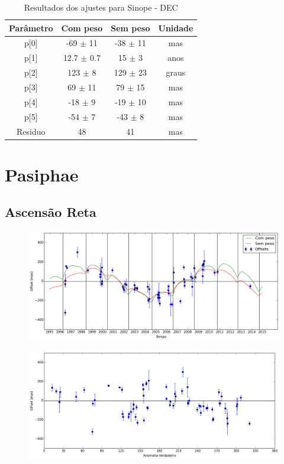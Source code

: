 \documentclass[11pt,a4paper]{report}
\begin{document}
\begin{table}[h!]
\caption{\label{Tab: Sinope-DEC} Resultados dos ajustes para Sinope - DEC}
\begin{centering}
\begin{tabular}{cccc}
\hline
\hline
Parâmetro & Com peso & Sem peso & Unidade\tabularnewline
\hline
p[0] & -69 $\pm$ 11 & -38 $\pm$ 11 & mas\\
p[1] & 12.7 $\pm$ 0.7 & 15 $\pm$ 3 & anos\\
p[2] & 123 $\pm$ 8 & 129 $\pm$ 23 & graus\\
p[3] & 69 $\pm$ 11 & 79 $\pm$ 15 & mas\\
p[4] & -18 $\pm$ 9 & -19 $\pm$ 10 & mas\\
p[5] & -54 $\pm$ 7 & -43 $\pm$ 8 & mas\\
Residuo & 48 & 41 & mas\\
\hline 
\end{tabular} 
\par\end{centering}
\end{table}

\chapter*{Pasiphae}
\section*{Ascensão Reta}

\begin{figure}[h]
\includegraphics[scale=0.45]{Pasiphae/RA.png} 
\end{figure}

\begin{figure}[h]
\includegraphics[scale=0.45]{Pasiphae/RA_anom.png}  
\end{figure}
\end{document}
